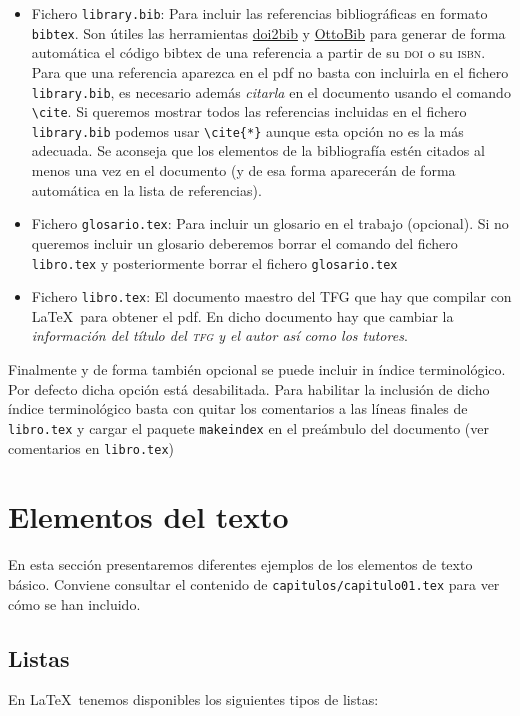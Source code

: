 \begin{itemize}
  \item Fichero \texttt{library.bib}: Para incluir las referencias bibliográficas en formato \texttt{bibtex}. Son útiles las herramientas \href{https://www.doi2bib.org/}{doi2bib} y \href{https://www.ottobib.com/}{OttoBib} para generar de forma automática el código bibtex de una referencia a partir de su \textsc{doi} o su \textsc{isbn}. Para que una referencia aparezca en el pdf no basta con incluirla en el fichero \texttt{library.bib}, es necesario además \emph{citarla} en el documento usando el comando \verb+\cite+. Si queremos mostrar todos las referencias incluidas en el fichero \texttt{library.bib} podemos usar \verb+\cite{*}+ aunque esta opción no es la más adecuada. Se aconseja que los elementos de la bibliografía estén citados al menos una vez en el documento (y de esa forma aparecerán de forma automática en la lista de referencias).

  \item Fichero \texttt{glosario.tex}: Para incluir un glosario en el trabajo (opcional). Si no queremos incluir un glosario deberemos borrar el comando \verb++ del fichero \texttt{libro.tex} y posteriormente borrar el fichero \texttt{glosario.tex}

   \item Fichero \texttt{libro.tex}: El documento maestro del TFG que hay que compilar con \LaTeX\ para obtener el pdf. En dicho documento hay que cambiar la \emph{información del título del \textsc{tfg} y el autor así como los tutores}.
\end{itemize}

Finalmente y de forma también opcional se puede incluir in índice terminológico. Por defecto dicha opción está desabilitada. Para habilitar la inclusión de dicho índice terminológico basta con quitar los comentarios a las líneas finales de \texttt{libro.tex} y cargar el paquete \texttt{makeindex} en el preámbulo del documento (ver comentarios en \texttt{libro.tex})


\section{Elementos del texto}

En esta sección presentaremos diferentes ejemplos de los elementos de texto básico. Conviene consultar el contenido de \texttt{capitulos/capitulo01.tex} para ver cómo se han incluido.

\subsection{Listas}
En \LaTeX\ tenemos disponibles los siguientes tipos de listas:

